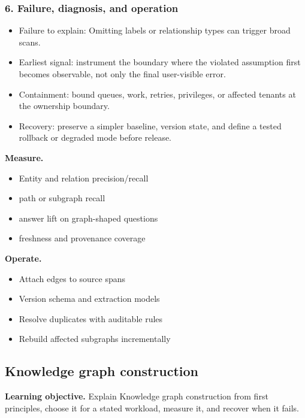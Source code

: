 \subsubsection*{6. Failure, diagnosis, and operation}
\begin{itemize}
\item Failure to explain: Omitting labels or relationship types can trigger broad scans.
\item Earliest signal: instrument the boundary where the violated assumption first becomes observable, not only the final user-visible error.
\item Containment: bound queues, work, retries, privileges, or affected tenants at the ownership boundary.
\item Recovery: preserve a simpler baseline, version state, and define a tested rollback or degraded mode before release.
\end{itemize}
\textbf{Measure.}\begin{itemize}
\item Entity and relation precision/recall
\item path or subgraph recall
\item answer lift on graph-shaped questions
\item freshness and provenance coverage
\end{itemize}
\textbf{Operate.}\begin{itemize}
\item Attach edges to source spans
\item Version schema and extraction models
\item Resolve duplicates with auditable rules
\item Rebuild affected subgraphs incrementally
\end{itemize}
\subsection{Knowledge graph construction}
\textbf{Learning objective.} Explain Knowledge graph construction from first principles, choose it for a stated workload, measure it, and recover when it fails.
